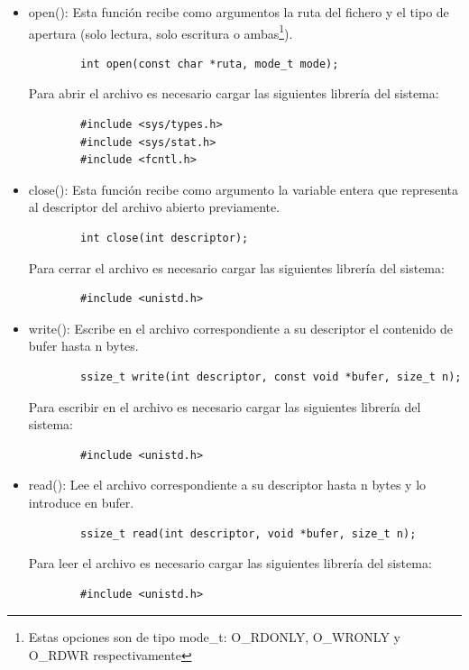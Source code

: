 \begin{itemize}
    \item open(): Esta función recibe como argumentos la ruta del fichero y el tipo de apertura (solo lectura, solo escritura o ambas\footnote{Estas opciones son de tipo mode\_t: O\_RDONLY, O\_WRONLY y O\_RDWR respectivamente}).
        \begin{verbatim} 
        int open(const char *ruta, mode_t mode);
        \end{verbatim}
    Para abrir el archivo es necesario cargar las siguientes librería del sistema:
        \begin{verbatim} 
        #include <sys/types.h>
        #include <sys/stat.h>
        #include <fcntl.h>
        \end{verbatim}
    \item close(): Esta función recibe como argumento la variable entera que representa al descriptor del archivo abierto previamente.
        \begin{verbatim} 
        int close(int descriptor);
        \end{verbatim}
    Para cerrar el archivo es necesario cargar las siguientes librería del sistema:
        \begin{verbatim} 
        #include <unistd.h>
        \end{verbatim}
    
    \item write(): Escribe en el archivo correspondiente a su descriptor el contenido de bufer hasta n bytes.
        \begin{verbatim} 
        ssize_t write(int descriptor, const void *bufer, size_t n);
        \end{verbatim}
    Para escribir en el archivo es necesario cargar las siguientes librería del sistema:
        \begin{verbatim} 
        #include <unistd.h>
        \end{verbatim}
    \item read(): Lee el archivo correspondiente a su descriptor hasta n bytes y lo introduce en bufer.
        \begin{verbatim} 
        ssize_t read(int descriptor, void *bufer, size_t n);
        \end{verbatim}
        Para leer el archivo es necesario cargar las siguientes librería del sistema:
        \begin{verbatim} 
        #include <unistd.h>
        \end{verbatim}
\end{itemize}

